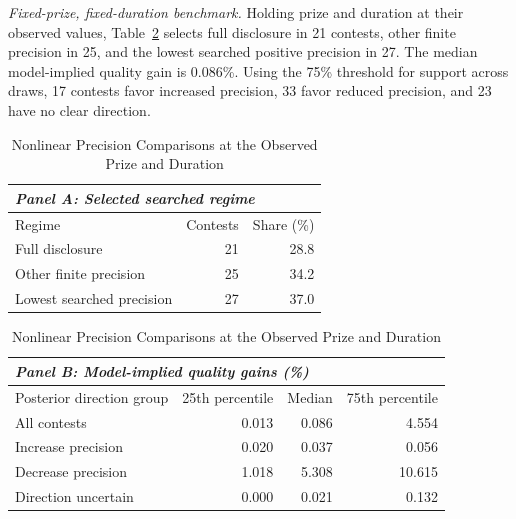 \textit{Fixed-prize, fixed-duration benchmark.} Holding prize and duration at their observed values, Table~\ref{tab-fixed-precision} selects full disclosure in 21 contests, other finite precision in 25, and the lowest searched positive precision in 27. The median model-implied quality gain is 0.086\%. Using the 75\% threshold for support across draws, 17 contests favor increased precision, 33 favor reduced precision, and 23 have no clear direction.

\begin{table}[!htbp]
\centering
\caption{Nonlinear Precision Comparisons at the Observed Prize and Duration}
\label{tab-fixed-precision}
{\small
\begin{tabularx}{\textwidth}{Xrr}
\multicolumn{3}{l}{\textit{Panel A: Selected searched regime}}\\
\midrule
Regime & Contests & Share (\%)\\
\midrule
Full disclosure & 21 & 28.8 \\
Other finite precision & 25 & 34.2 \\
Lowest searched precision & 27 & 37.0 \\
\bottomrule
\end{tabularx}
\vspace{2ex}
\begin{tabularx}{\textwidth}{Xrrr}
\multicolumn{4}{l}{\textit{Panel B: Model-implied quality gains (\%)}}\\
\midrule
Posterior direction group & 25th percentile & Median & 75th percentile\\
\midrule
All contests & 0.013 & 0.086 & 4.554\\
Increase precision & 0.020 & 0.037 & 0.056\\
Decrease precision & 1.018 & 5.308 & 10.615\\
Direction uncertain & 0.000 & 0.021 & 0.132\\
\bottomrule
\end{tabularx}}
\begin{minipage}{\textwidth}\figtabnotesize

\end{minipage}
\end{table}
